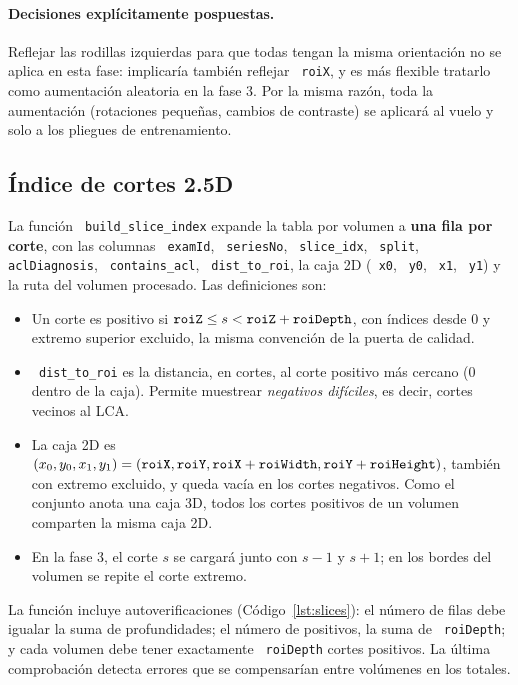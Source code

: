 \documentclass[12pt,letterpaper]{article}
\newcommand{\code}[1]{\texttt{\hyphenchar\font=-1 #1}}
\begin{document}
\paragraph{Decisiones explícitamente pospuestas.} Reflejar las rodillas izquierdas para que todas tengan la misma orientación no se aplica en esta fase: implicaría también reflejar \code{roiX}, y es más flexible tratarlo como aumentación aleatoria en la fase 3. Por la misma razón, toda la aumentación (rotaciones pequeñas, cambios de contraste) se aplicará al vuelo y solo a los pliegues de entrenamiento.

\subsection{Índice de cortes 2.5D}

La función \code{build\_slice\_index} expande la tabla por volumen a \textbf{una fila por corte}, con las columnas \code{examId}, \code{seriesNo}, \code{slice\_idx}, \code{split}, \code{aclDiagnosis}, \code{contains\_acl}, \code{dist\_to\_roi}, la caja 2D (\code{x0}, \code{y0}, \code{x1}, \code{y1}) y la ruta del volumen procesado. Las definiciones son:

\begin{itemize}[leftmargin=*]
  \item Un corte es positivo si $\code{roiZ} \le s < \code{roiZ} + \code{roiDepth}$, con índices desde 0 y extremo superior excluido, la misma convención de la puerta de calidad.
  \item \code{dist\_to\_roi} es la distancia, en cortes, al corte positivo más cercano (0 dentro de la caja). Permite muestrear \emph{negativos difíciles}, es decir, cortes vecinos al LCA.
  \item La caja 2D es $(x_0,y_0,x_1,y_1)=(\code{roiX},\code{roiY},\code{roiX}+\code{roiWidth},\code{roiY}+\code{roiHeight})$, también con extremo excluido, y queda vacía en los cortes negativos. Como el conjunto anota una caja 3D, todos los cortes positivos de un volumen comparten la misma caja 2D.
  \item En la fase 3, el corte $s$ se cargará junto con $s-1$ y $s+1$; en los bordes del volumen se repite el corte extremo.
\end{itemize}

\noindent La función incluye autoverificaciones (Código~\ref{lst:slices}): el número de filas debe igualar la suma de profundidades; el número de positivos, la suma de \code{roiDepth}; y cada volumen debe tener exactamente \code{roiDepth} cortes positivos. La última comprobación detecta errores que se compensarían entre volúmenes en los totales.
\end{document}
